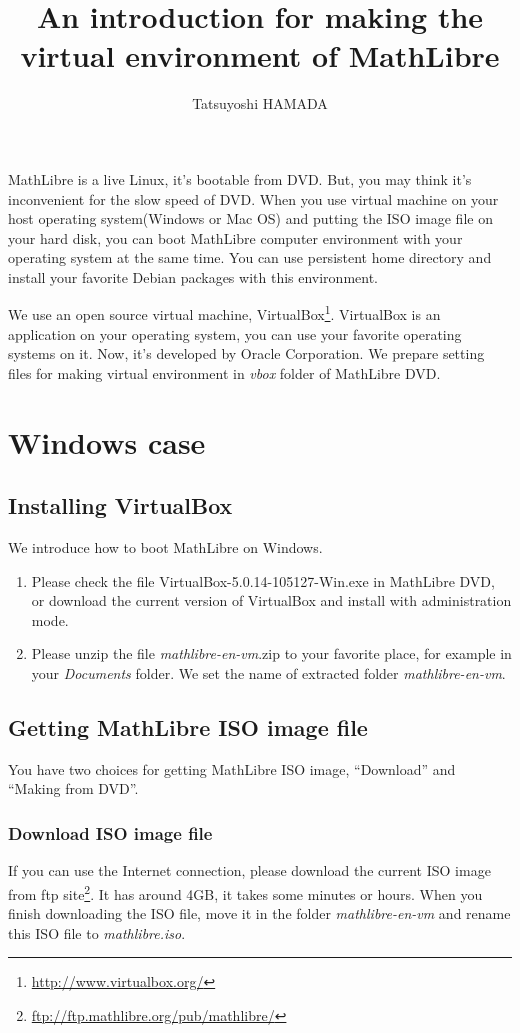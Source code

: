 \documentclass[a4]{article}
\title{An introduction for making the virtual environment of MathLibre}
\author{Tatsuyoshi HAMADA}
\newcommand{\vboxwin}{VirtualBox-5.0.14-105127-Win.exe}
\newcommand{\vm}{{\em mathlibre-en-vm}}
\begin{document}
\maketitle
MathLibre is a live Linux, it's bootable from DVD.
But, you may think it's inconvenient for the slow speed of DVD.
When you use virtual machine on your host operating system(Windows or Mac OS) and
putting the ISO image file on your hard disk,
you can boot MathLibre computer environment with your operating system
at the same time.
You can use persistent home directory and install your favorite Debian
packages with this environment.

We use an open source virtual machine,
VirtualBox\footnote{\url{http://www.virtualbox.org/}}.
VirtualBox is an application on your operating system,
you can use your favorite operating systems on it.
Now, it's developed by Oracle Corporation.
We prepare setting files for making virtual environment 
in {\em vbox} folder of MathLibre DVD.

\section{Windows case}
\subsection{Installing VirtualBox}
We introduce how to boot MathLibre on Windows.
\begin{enumerate}
 \item Please check the file \vboxwin{} in MathLibre DVD, or download the
       current version of VirtualBox and install with administration mode.
 \item Please unzip the file \vm.zip{} to your favorite place, for example
       in your {\em Documents} folder. We set the name of extracted folder \vm{}.
\end{enumerate}

\subsection{Getting MathLibre ISO image file}
You have two choices for getting MathLibre ISO image,
``Download'' and ``Making from DVD''.

\subsubsection{Download ISO image file}
If you can use the Internet connection,
please download the current ISO image from ftp site\footnote{\url{ftp://ftp.mathlibre.org/pub/mathlibre/}}.
It has around 4GB, it takes some minutes or hours.
When you finish downloading the ISO file,
move it in the folder \vm{} and rename this ISO file to
{\em mathlibre.iso}. 
\end{document}
